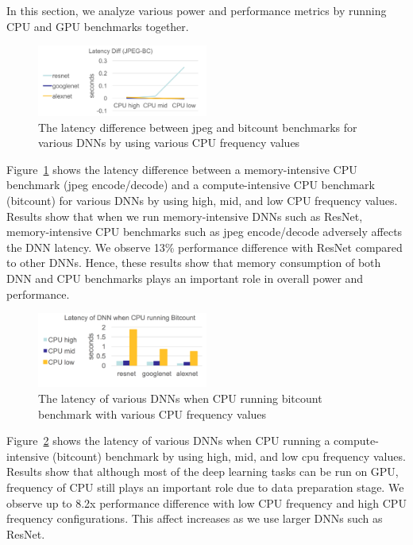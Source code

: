 
In this section, we analyze various power and performance metrics by running CPU and GPU benchmarks together. 


\begin{figure}[h]
    \centering
    \includegraphics[width=0.5\textwidth]{latencydiff.png}
    \caption{The latency difference between jpeg and bitcount benchmarks for various DNNs by using various CPU frequency values}\label{fig:latencydiff}
\end{figure}


Figure~\ref{fig:latencydiff} shows the latency difference between a memory-intensive CPU benchmark (jpeg encode/decode) and a compute-intensive CPU benchmark (bitcount) for various DNNs by using high, mid, and low CPU frequency values. Results show that when we run memory-intensive DNNs such as ResNet, memory-intensive CPU benchmarks such as jpeg encode/decode adversely affects the DNN latency. We observe 13\% performance difference with ResNet compared to other DNNs. Hence, these results show that memory consumption of both DNN and CPU benchmarks plays an important role in overall power and performance. 

\begin{figure}[h]
    \centering
    \includegraphics[width=0.5\textwidth]{latencycpu.png}
    \caption{The latency of various DNNs when CPU running bitcount benchmark with various CPU frequency values}\label{fig:latencycpu}
\end{figure}


Figure~\ref{fig:latencycpu} shows the latency of various DNNs when CPU running a compute-intensive (bitcount) benchmark by using high, mid, and low cpu frequency values. Results show that although most of the deep learning tasks can be run on GPU, frequency of CPU still plays an important role due to data preparation stage. We observe up to 8.2x performance difference with low CPU frequency and high CPU frequency configurations. This affect increases as we use larger DNNs such as ResNet. 

